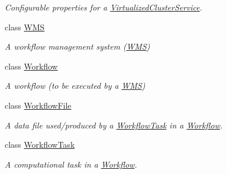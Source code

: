 \begin{DoxyCompactItemize}
\begin{DoxyCompactList}\small\item\em Configurable properties for a \hyperlink{classwrench_1_1_virtualized_cluster_service}{Virtualized\+Cluster\+Service}. \end{DoxyCompactList}\item 
class \hyperlink{classwrench_1_1_w_m_s}{W\+MS}
\begin{DoxyCompactList}\small\item\em A workflow management system (\hyperlink{classwrench_1_1_w_m_s}{W\+MS}) \end{DoxyCompactList}\item 
class \hyperlink{classwrench_1_1_workflow}{Workflow}
\begin{DoxyCompactList}\small\item\em A workflow (to be executed by a \hyperlink{classwrench_1_1_w_m_s}{W\+MS}) \end{DoxyCompactList}\item 
class \hyperlink{classwrench_1_1_workflow_file}{Workflow\+File}
\begin{DoxyCompactList}\small\item\em A data file used/produced by a \hyperlink{classwrench_1_1_workflow_task}{Workflow\+Task} in a \hyperlink{classwrench_1_1_workflow}{Workflow}. \end{DoxyCompactList}\item 
class \hyperlink{classwrench_1_1_workflow_task}{Workflow\+Task}
\begin{DoxyCompactList}\small\item\em A computational task in a \hyperlink{classwrench_1_1_workflow}{Workflow}. \end{DoxyCompactList}\end{DoxyCompactItemize}
